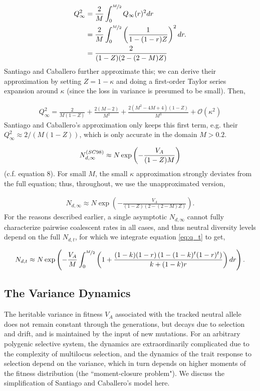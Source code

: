 \documentclass[11pt]{article}
\begin{document}
\begin{align}
  Q_\infty^2 &= \frac{2}{M}\int_0^{\nicefrac{M}{2}} Q_{\infty}(r)^2 dr  \nonumber \\
  &=  \frac{2}{M} \int_0^{\nicefrac{M}{2}} \left(\frac{1}{1 - (1-r)Z}\right)^2 dr. \nonumber  \\
  &= \frac{2}{(1-Z) (2-(2-M) Z)}
\end{align}
%
Santiago and Caballero further approximate this; we can derive their
approximation by setting $Z = 1-\kappa$ and doing a first-order Taylor series
expansion around $\kappa$ (since the loss in variance is presumed to be small).
Then,

\begin{align}
  Q_\infty^2 = \frac{2}{M (1-Z)} + \frac{2 (M-2)}{M^2}+\frac{2 \left(M^2-4 M+4\right) (1-Z)}{M^3} + \mathcal{O}(\kappa^2)
\end{align}
%
Santiago and Caballero's approximation only keeps this first term, e.g. their
$Q_\infty^2 \approx 2/(M(1-Z))$, which is only accurate in the domain $M >
0.2$. 

\begin{align}
  N_{d,\infty}^{\text(SC98)} \approx N \exp\left(-\frac{V_A}{(1-Z)M}\right) 
\end{align}
%
(c.f. \cite{Santiago1998-bs} equation 8). For small $M$, the small $\kappa$
approximation strongly deviates from the full equation; thus, throughout, we
use the unapproximated version,

\begin{align}
  \label{eq:Ne_inf}
  N_{d,\infty} \approx N \exp\left(-\frac{V_A}{(1-Z) (2-(2-M) Z)} \right).
\end{align}
%
For the reasons described earlier, a single asymptotic $N_{d,\infty}$ cannot
fully characterize pairwise coalescent rates in all cases, and thus neutral
diversity levels depend on the full $N_{d,t}$, for which we integrate equation
\eqref{eq:q_t} to get,

\begin{align}
  \label{eq:net_integral}
  N_{d,t} \approx N \exp\left(-\frac{V_A}{M} \int_0^{\nicefrac{M}{2}} \left(1+\frac{(1-k) (1-r) \left(1-(1-k)^t (1-r)^t\right)}{k+(1-k)r} \right) dr \right).
\end{align}

\subsection{The Variance Dynamics}

The heritable variance in fitness $V_A$ associated with the tracked neutral
allele does not remain constant through the generations, but decays due to
selection and drift, and is maintained by the input of new mutations. For an
arbitrary polygenic selective system, the dynamics are extraordinarily
complicated due to the complexity of multilocus selection, and the dynamics of
the trait response to selection depend on the variance, which in turn depends
on higher moments of the fitness distribution (the ``moment-closure problem").
We discuss the simplification of Santiago and Caballero's model here.
\end{document}
